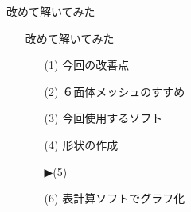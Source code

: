 \begin{frame}{改めて解いてみた}
  \begin{itemize}
      \item[] 改めて解いてみた
      \begin{itemize}[itemsep=1.3ex, leftmargin=1cm]
        \item[(1)]  {\color{cud_lightgray}今回の改善点}
	\item[(2)]  {\color{cud_lightgray}６面体メッシュのすすめ}
        \item[(3)]  {\color{cud_lightgray}今回使用するソフト}
        \item[(4)]  {\color{cud_lightgray}形状の作成}
	\item[▶(5)]  
	\item[(6)]  {\color{cud_lightgray}表計算ソフトでグラフ化}
      \end{itemize}
  \end{itemize}
\end{frame}
